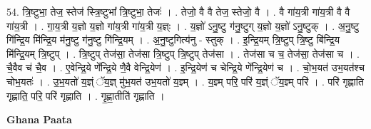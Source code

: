 \documentclass[17pt]{extarticle}
\begin{document}
54. त्रि॒ष्टुभा॒ तेज॒ स्तेज॑ स्त्रि॒ष्टुभा᳚ त्रि॒ष्टुभा॒ तेजः॑ । . तेजो॒ वै वै तेज॒ स्तेजो॒ वै । . वै गा॑य॒त्री गा॑य॒त्री वै वै गा॑य॒त्री । . गा॒य॒त्री य॒ज्ञो य॒ज्ञो गा॑य॒त्री गा॑य॒त्री य॒ज्ञ्ः । . य॒ज्ञो॑ ऽनु॒ष्टु ग॑नु॒ष्टुग् य॒ज्ञो य॒ज्ञो॑ ऽनु॒ष्टुक् । . अ॒नु॒ष्टु गि॑न्द्रि॒य मि॑न्द्रि॒य म॑नु॒ष्टु ग॑नु॒ष्टु गि॑न्द्रि॒यम् । . अ॒नु॒ष्टुगित्य॑नु - स्तुक् । . इ॒न्द्रि॒यम् त्रि॒ष्टुप् त्रि॒ष्टु बि॑न्द्रि॒य मि॑न्द्रि॒यम् त्रि॒ष्टुप् । . त्रि॒ष्टुप् तेज॑सा॒ तेज॑सा त्रि॒ष्टुप् त्रि॒ष्टुप् तेज॑सा । . तेज॑सा च च॒ तेज॑सा॒ तेज॑सा च । . चै॒वैव च॑ चै॒व । . ए॒वेन्द्रि॒ये णे᳚न्द्रि॒ये णै॒वै वेन्द्रि॒येण॑ । . इ॒न्द्रि॒येण॑ च चेन्द्रि॒ये णे᳚न्द्रि॒येण॑ च । . चो॒भ॒यत॑ उभ॒यत॑श्च चोभ॒यतः॑ । . उ॒भ॒यतो॑ य॒ज्ञ्ं ॅय॒ज्ञ् मु॑भ॒यत॑ उभ॒यतो॑ य॒ज्ञ्म् । . य॒ज्ञ्म् परि॒ परि॑ य॒ज्ञ्ं ॅय॒ज्ञ्म् परि॑ । . परि॑ गृह्णाति गृह्णाति॒ परि॒ परि॑ गृह्णाति । . गृ॒ह्णा॒तीति॑ गृह्णाति । \newline

\textbf{Ghana Paata } \newline
\end{document}
